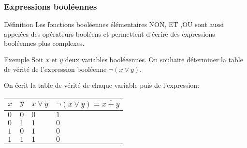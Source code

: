 \documentclass[9pt]{beamer}
\begin{document}
\begin{frame}
\frametitle{Expressions booléennes}

\begin{block}{Définition}
Les fonctions booléennes élémentaires NON, ET ,OU sont aussi appelées des opérateurs booléens et permettent d'écrire des expressions booléennes plus complexes.
\end{block}

\begin{exampleblock}{Exemple}
Soit $x$ et $y$ deux variables booléeennes. On souhaite déterminer la table de vérité de l'expression booléenne $\neg(x \vee y)$.

On écrit la table de vérité de chaque variable puis de l'expression:

\begin{center}
\begin{tabular}{*{2}{|C{0.6cm}}|C{1.2cm}|C{2.4cm}|}\hline
$x$ & $y$ & $x \vee y$ & $\neg(x \vee y)=\overline{x+y}$\\\hline
$0$ & $0$ & $0$ & $1$ \\\hline
$0$ & $1$ & $1$ & $0$\\\hline
$1$ & $0$ & $1$ & $0$\\\hline
$1$ & $1$ & $1$ & $0$\\\hline
\end{tabular}
\end{center}
\end{exampleblock}
\end{frame}
\end{document}
